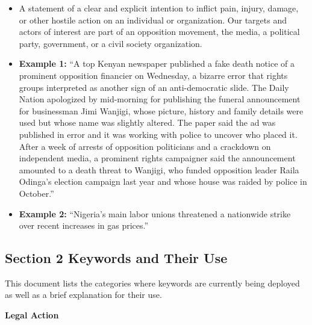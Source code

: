 \documentclass[
  letterpaper,
  DIV=11,
  numbers=noendperiod]{scrartcl}
\providecommand{\tightlist}{%
  \setlength{\itemsep}{0pt}\setlength{\parskip}{0pt}}\usepackage{longtable,booktabs,array}
\begin{document}
\begin{itemize}
  \begin{itemize}
  \tightlist
  \item
    A statement of a clear and explicit intention to inflict pain,
    injury, damage, or other hostile action on an individual or
    organization. Our targets and actors of interest are part of an
    opposition movement, the media, a political party, government, or a
    civil society organization.
  \item
    \textbf{Example 1:} ``A top Kenyan newspaper published a fake death
    notice of a prominent opposition financier on Wednesday, a bizarre
    error that rights groups interpreted as another sign of an
    anti-democratic slide. The Daily Nation apologized by mid-morning
    for publishing the funeral announcement for businessman Jimi
    Wanjigi, whose picture, history and family details were used but
    whose name was slightly altered. The paper said the ad was published
    in error and it was working with police to uncover who placed it.
    After a week of arrests of opposition politicians and a crackdown on
    independent media, a prominent rights campaigner said the
    announcement amounted to a death threat to Wanjigi, who funded
    opposition leader Raila Odinga's election campaign last year and
    whose house was raided by police in October.''
  \item
    \textbf{Example 2:} ``Nigeria's main labor unions threatened a
    nationwide strike over recent increases in gas prices.''
  \end{itemize}
\end{itemize}

\subsection{Section 2 Keywords and Their
Use}\label{section-2-keywords-and-their-use}

This document lists the categories where keywords are currently being
deployed as well as a brief explanation for their use.

\textbf{Legal Action}
\end{document}
